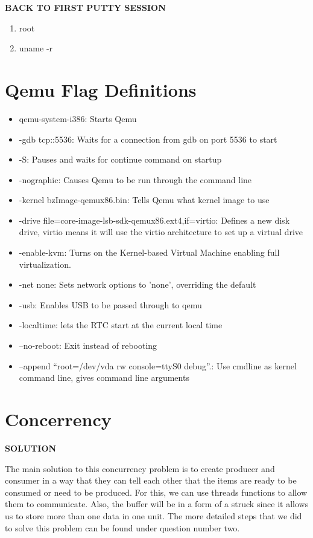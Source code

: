 \documentclass[letterpaper,10pt]{article}
\begin{document}
\textbf{BACK TO FIRST PUTTY SESSION}
\begin{enumerate}
\item root
\item uname -r
\end{enumerate}

\newpage

\section*{Qemu Flag Definitions}

\begin{itemize}
\item qemu-system-i386: Starts Qemu
\item -gdb tcp::5536: Waits for a connection from gdb on port 5536 to start
\item -S: Pauses and waits for continue command on startup
\item -nographic: Causes Qemu to be run through the command line
\item -kernel bzImage-qemux86.bin: Tells Qemu what kernel image to use
\item -drive file=core-image-lsb-sdk-qemux86.ext4,if=virtio: Defines a new disk drive, virtio means it will use the virtio architecture to set up a virtual drive
\item -enable-kvm: Turns on the Kernel-based Virtual Machine enabling full virtualization.
\item -net none: Sets network options to ’none’, overriding the default
\item -usb: Enables USB to be passed through to qemu
\item -localtime: lets the RTC start at the current local time
\item –no-reboot: Exit instead of rebooting
\item –append “root=/dev/vda rw console=ttyS0 debug”.: Use cmdline as kernel command line, gives command line arguments
\end{itemize}
\newpage

\section*{Concerrency} 
\textbf{SOLUTION}

The main solution to this concurrency problem is to create producer and consumer in a way that they can tell each other that the items are ready to be consumed or need to be produced. For this, we can use threads functions to allow them to communicate. Also, the buffer will be in a form of a struck since it allows us to store more than one data in one unit. The more detailed steps that we did to solve this problem can be found under question number two.\\
\end{document}
